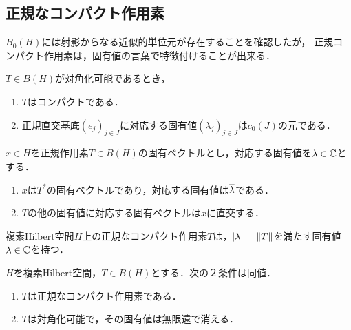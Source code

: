 \documentclass[uplatex,dvipdfmx]{jsreport}
\begin{document}
\subsection{正規なコンパクト作用素}

\begin{tcolorbox}[colframe=ForestGreen, colback=ForestGreen!10!white,breakable,colbacktitle=ForestGreen!40!white,coltitle=black,fonttitle=\bfseries\sffamily,
title=]
    $B_0(H)$には射影からなる近似的単位元が存在することを確認したが，
    正規コンパクト作用素は，固有値の言葉で特徴付けることが出来る．
\end{tcolorbox}

\begin{lemma}
    $T\in B(H)$が対角化可能であるとき，
    \begin{enumerate}
        \item $T$はコンパクトである．
        \item 正規直交基底$(e_j)_{j\in J}$に対応する固有値$(\lambda_j)_{j\in J}$は$c_0(J)$の元である．
    \end{enumerate}
\end{lemma}

\begin{lemma}
    $x\in H$を正規作用素$T\in B(H)$の固有ベクトルとし，対応する固有値を$\lambda\in\mathbb{C}$とする．
    \begin{enumerate}
        \item $x$は$T^*$の固有ベクトルであり，対応する固有値は$\overline{\lambda}$である．
        \item $T$の他の固有値に対応する固有ベクトルは$x$に直交する．
    \end{enumerate}
\end{lemma}

\begin{lemma}
    複素Hilbert空間$H$上の正規なコンパクト作用素$T$は，$\lvert\lambda\rvert=\|T\|$を満たす固有値$\lambda\in\mathbb{C}$を持つ．
\end{lemma}

\begin{theorem}[正規コンパクト作用素の特徴付け]
    $H$を複素Hilbert空間，$T\in B(H)$とする．次の２条件は同値．
    \begin{enumerate}
        \item $T$は正規なコンパクト作用素である．
        \item $T$は対角化可能で，その固有値は無限遠で消える．
    \end{enumerate}
\end{theorem}
\end{document}

